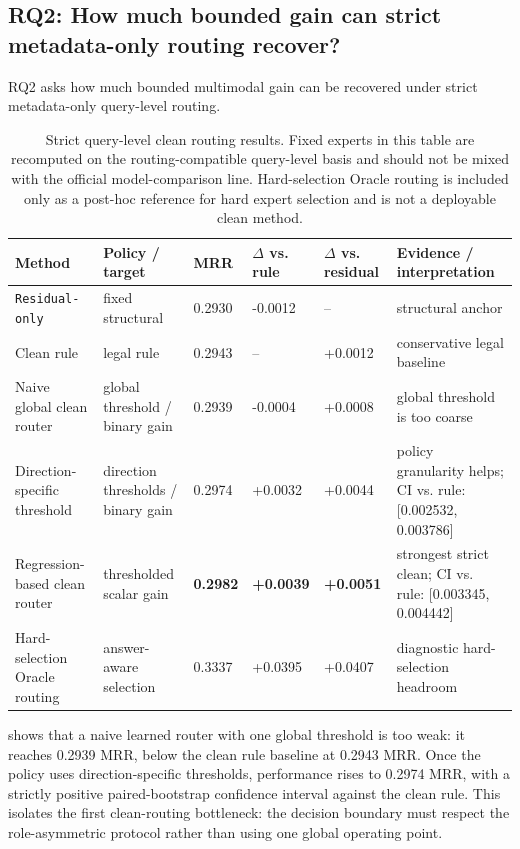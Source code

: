 \documentclass[11pt]{article}
\begin{document}
\subsection{RQ2: How much bounded gain can strict metadata-only routing recover?}
RQ2 asks how much bounded multimodal gain can be recovered under strict metadata-only query-level routing.

\begin{table}[H]
\centering
\caption{Strict query-level clean routing results. Fixed experts in this table are recomputed on the routing-compatible query-level basis and should not be mixed with the official model-comparison line. Hard-selection Oracle routing is included only as a post-hoc reference for hard expert selection and is not a deployable clean method.}
\label{tab:main_clean_routing}
\scriptsize
\setlength{\tabcolsep}{2pt}
\begin{tabular}{p{}p{}p{}p{}p{}p{}}
\toprule
Method & Policy / target & MRR & $\Delta$ vs. rule & $\Delta$ vs. residual & Evidence / interpretation \\
\midrule
\texttt{Residual-only} & fixed structural & 0.2930 & -0.0012 & -- & structural anchor \\
Clean rule & legal rule & 0.2943 & -- & +0.0012 & conservative legal baseline \\
Naive global clean router & global threshold / binary gain & 0.2939 & -0.0004 & +0.0008 & global threshold is too coarse \\
Direction-specific threshold & direction thresholds / binary gain & 0.2974 & +0.0032 & +0.0044 & policy granularity helps; CI vs. rule: [0.002532, 0.003786] \\
Regression-based clean router & thresholded scalar gain & \textbf{0.2982} & \textbf{+0.0039} & \textbf{+0.0051} & strongest strict clean; CI vs. rule: [0.003345, 0.004442] \\
Hard-selection Oracle routing & answer-aware selection & 0.3337 & +0.0395 & +0.0407 & diagnostic hard-selection headroom \\
\bottomrule
\end{tabular}
\end{table}

 shows that a naive learned router with one global threshold is too weak: it reaches 0.2939 MRR, below the clean rule baseline at 0.2943 MRR. Once the policy uses direction-specific thresholds, performance rises to 0.2974 MRR, with a strictly positive paired-bootstrap confidence interval against the clean rule. This isolates the first clean-routing bottleneck: the decision boundary must respect the role-asymmetric protocol rather than using one global operating point.
\end{document}
